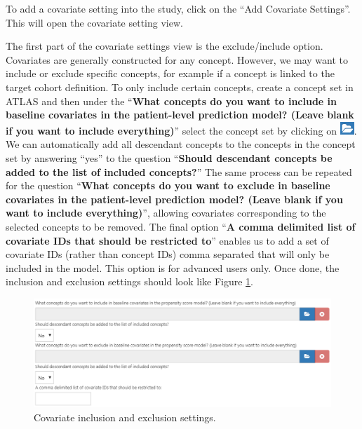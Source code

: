 \documentclass[11pt]{book}
\theoremstyle{definition}
\theoremstyle{definition}
\theoremstyle{definition}
\theoremstyle{remark}
\begin{document}
To add a covariate setting into the study, click on the ``Add Covariate Settings''. This will open the covariate setting view.

The first part of the covariate settings view is the exclude/include option. Covariates are generally constructed for any concept. However, we may want to include or exclude specific concepts, for example if a concept is linked to the target cohort definition. To only include certain concepts, create a concept set in ATLAS and then under the ``\textbf{What concepts do you want to include in baseline covariates in the patient-level prediction model? (Leave blank if you want to include everything)}'' select the concept set by clicking on \includegraphics{images/PopulationLevelEstimation/open.png}. We can automatically add all descendant concepts to the concepts in the concept set by answering ``yes'' to the question ``\textbf{Should descendant concepts be added to the list of included concepts?}'' The same process can be repeated for the question ``\textbf{What concepts do you want to exclude in baseline covariates in the patient-level prediction model? (Leave blank if you want to include everything)}'', allowing covariates corresponding to the selected concepts to be removed. The final option ``\textbf{A comma delimited list of covariate IDs that should be restricted to}'' enables us to add a set of covariate IDs (rather than concept IDs) comma separated that will only be included in the model. This option is for advanced users only. Once done, the inclusion and exclusion settings should look like Figure \ref{fig:covariateSettings1}.

\begin{figure}

{\centering \includegraphics[width=1\linewidth]{images/PatientLevelPrediction/covariateSettings1} 

}

\caption{Covariate inclusion and exclusion settings.}\label{fig:covariateSettings1}
\end{figure}
\end{document}
